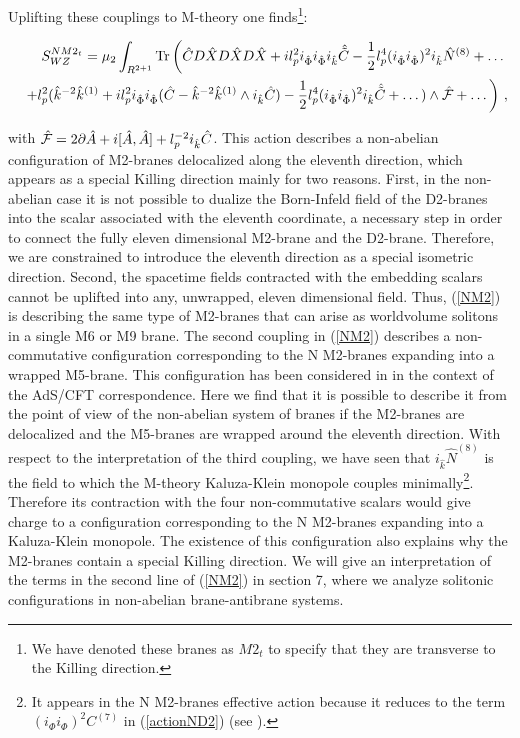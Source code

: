 \documentclass[12pt,a4paper]{article}
\begin{document}
Uplifting these couplings to M-theory one finds\footnote{We have
denoted these branes as $M2_t$ to specify that they are transverse to the
Killing direction.}:

\begin{eqnarray}
\label{NM2}
&&S^{NM2_t}_{WZ}=\mu_2\int_{R^{2+1}}{\rm Tr}\left({\hat C}D{\hat X}D{\hat X}
D{\hat X}+il_p^2 i_{\hat \Phi} i_{\hat \Phi} i_{\hat k} 
{\hat {\tilde C}}-\frac12 l_p^4 (i_{\hat \Phi} i_{\hat \Phi})^2
i_{\hat k}{\hat N}^{(8)}+\dots\right.\nonumber\\
&&\left.+l_p^2({\hat k}^{-2}{\hat k}^{(1)}+il_p^2 i_{\hat \Phi}i_{\hat \Phi}
({\hat C}-{\hat k}^{-2}{\hat k}^{(1)}\wedge i_{\hat k}{\hat C})
-\frac12 l_p^4 (i_{\hat \Phi}i_{\hat \Phi})^2 i_{\hat k}{\hat {\tilde C}}
+\dots)\wedge {\hat {\cal F}}+\dots\right)\, ,
\end{eqnarray}

\noindent with ${\hat {\cal F}}=2\partial {\hat A}+
i[{\hat A},{\hat A}]+l_p^{-2}i_{\hat k}{\hat C}$.
This action describes a non-abelian configuration 
of M2-branes delocalized along the eleventh direction,
which appears as a special Killing direction mainly for two reasons.
First, in the non-abelian case it is not possible to dualize the
Born-Infeld field of the D2-branes into the scalar associated with
the eleventh coordinate,
a necessary step in order to connect the 
fully eleven dimensional M2-brane and the D2-brane. Therefore, we
are constrained to introduce the eleventh direction as a special
isometric direction. 
Second, the spacetime fields
contracted with the embedding scalars cannot be uplifted into
any, unwrapped, eleven dimensional field.
Thus, (\ref{NM2}) is describing the same type of
M2-branes that can arise as worldvolume solitons in a single
M6 or M9 brane. 
The second coupling in (\ref{NM2}) describes a non-commutative
configuration corresponding to the N M2-branes expanding into a wrapped
M5-brane. This configuration has been considered in \cite{Bena2} in
the context of the AdS/CFT correspondence. Here we find that it is
possible to describe it from the point of view of the non-abelian
system of branes if the M2-branes are delocalized and the M5-branes
are wrapped around the eleventh direction.
With respect to the interpretation of the third coupling,
we have seen that $i_{\hat k} {\hat N}^{(8)}$ is the field to which
the M-theory Kaluza-Klein monopole couples minimally\footnote{It
appears in the N M2-branes effective action because it 
reduces to the term $(i_\Phi i_\Phi)^2 C^{(7)}$ in (\ref{actionND2})
(see \cite{BEL}).}. Therefore its contraction with the four 
non-commutative scalars would give charge to
a configuration corresponding to the N M2-branes expanding into
a Kaluza-Klein monopole. The existence of this configuration also
explains why the M2-branes contain a special
Killing direction. We will give an interpretation of the terms
in the second line of (\ref{NM2}) in section 7, where we analyze
solitonic configurations in non-abelian brane-antibrane systems.
\end{document}
